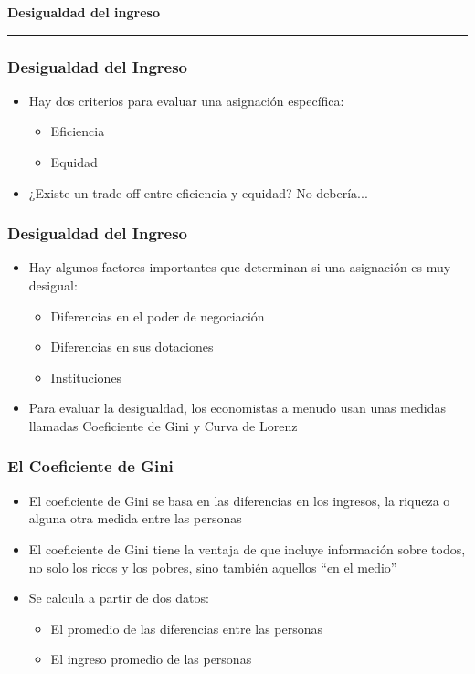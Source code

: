 \documentclass{beamer}
\begin{document}
\begin{frame}{}
\centering\huge\textbf{Desigualdad del ingreso} 
\vspace{2mm}
\hrule
\end{frame}

\begin{frame} 
\frametitle{Desigualdad del Ingreso}
\begin{itemize}
\item Hay dos criterios para evaluar una asignación específica: 
\begin{itemize}
    \item Eficiencia
    \item Equidad
\end{itemize}
\item ¿Existe un trade off entre eficiencia y equidad? No debería...
\end{itemize}
\end{frame}


\begin{frame} 
\frametitle{Desigualdad del Ingreso}
\begin{itemize}
\item Hay algunos factores importantes que determinan si una asignación es muy desigual: \begin{itemize}
    \item Diferencias en el poder de negociación
    \item Diferencias en sus dotaciones
    \item Instituciones
\end{itemize}
\item Para evaluar la desigualdad, los economistas a menudo usan unas medidas llamadas Coeficiente de Gini y Curva de Lorenz
\end{itemize}
\end{frame}

\begin{frame} 
\frametitle{El Coeficiente de Gini}
\begin{itemize}
\item El coeficiente de Gini se basa en las diferencias en los ingresos, la riqueza o alguna otra medida entre las personas
\item El coeficiente de Gini tiene la ventaja de que incluye información sobre todos, no solo los ricos y los pobres, sino también aquellos ``en el medio''
\item Se calcula a partir de dos datos:
        \begin{itemize}
            \item El promedio de las diferencias entre las personas
            \item El ingreso promedio de las personas
        \end{itemize}
\end{itemize}
\end{frame}
\end{document}
